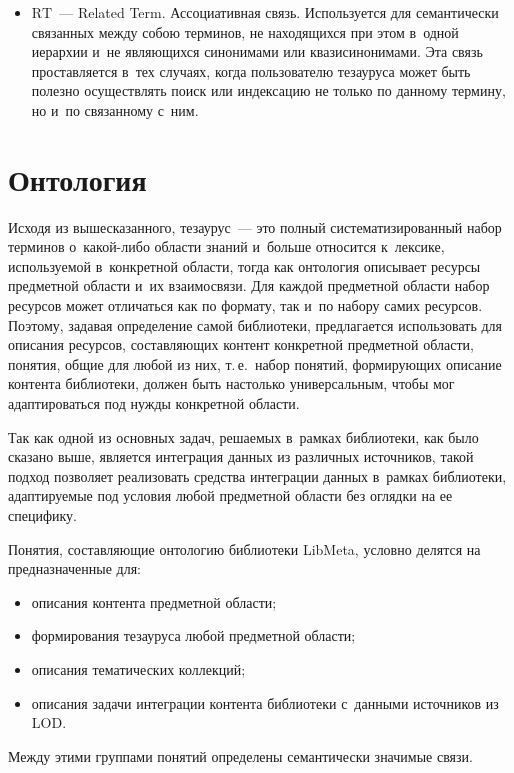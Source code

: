 \begin{multicols}{2}
\begin{itemize}
{}
\item $\mathrm{RT}$~--- Related Term. Ассоциативная связь. Используется для 
семантически связанных между собою терминов, не находящихся при 
этом в~одной иерархии и~не являющихся синонимами или 
квазисинонимами. Эта связь проставляется в~тех случаях, когда 
пользователю тезауруса может быть полезно осуществлять поиск или 
индексацию не только по данному термину, но и~по связанному с~ним.
\end{itemize}

\section{Онтология}

     Исходя из вышесказанного, тезаурус~--- это \mbox{полный} 
сис\-те\-ма\-ти\-зи\-ро\-ван\-ный набор терминов о~ка\-кой-ли\-бо об\-ласти знаний 
и~больше относится к~лексике, используемой в~конкретной об\-ласти, тогда 
как онтология описывает ресурсы предметной об\-ласти и~их взаимосвязи. Для 
каждой предметной об\-ласти набор ресурсов может отличаться как по 
формату, так и~по набору самих ресурсов. Поэтому, задавая определение 
самой библиотеки, предлагается использовать для описания ресурсов, 
со\-став\-ля\-ющих контент конкретной предметной об\-ласти, понятия, общие для 
любой из них, т.\,е.\ набор понятий, формирующих описание контента 
биб\-лио\-те\-ки, должен быть настолько универсальным, чтобы мог 
адаптироваться под нужды конкретной об\-ласти. 

Так как одной из основных 
задач, решаемых в~рамках биб\-лио\-те\-ки, как было сказано выше, является 
интеграция данных из различных источников, такой подход поз\-во\-ля\-ет 
реализовать средства интеграции данных в~рамках биб\-лио\-те\-ки, 
адап\-ти\-ру\-емые под условия любой предметной об\-ласти без оглядки на ее 
специфику.
     
     Понятия, составляющие онтологию библиотеки LibMeta, условно 
делятся на предназначенные для:
     \begin{itemize}
\item описания контента предметной об\-ласти;
\item формирования тезауруса любой предметной об\-ласти;
\item описания тематических коллекций; 
\item описания задачи интеграции контента биб\-лио\-те\-ки с~данными 
источников из LOD.
\end{itemize}

     Между этими группами понятий определены семантически значимые 
связи.
     

\end{multicols}
